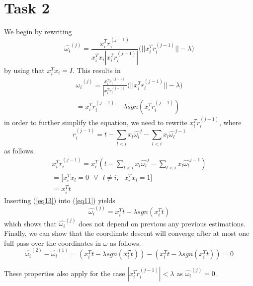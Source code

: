 \documentclass{article}
\begin{document}
\section{Task 2}
We begin by rewriting
\begin{equation}
    \hat{\omega_i}^{(j)} = \frac{x_i^T r_i^{(j-1)}}{x_i^T x_i |x_i^T r_i^{(j-1)}|} \bigg(||x_i^T r_i^{(j-1)}|| - \lambda \bigg)
\end{equation}
by using that $x_i^T x_i = I$. This results in
\begin{equation} \label{eq11}
\begin{split}
    \hat{\omega_i}^{(j)} = \frac{x_i^T r_i^{(j-1)}}{|x_i^T r_i^{(j-1)}|} \bigg(||x_i^T r_i^{(j-1)}|| - \lambda \bigg) \\
    = x_i^T r_i^{(j-1)} - \lambda sgn(x_i^T r_i^{(j-1)})
\end{split}
\end{equation}
in order to further simplify the equation, we need to rewrite $x_i^T r_i^{(j-1)}$, where
\begin{equation}
    r_i^{(j-1)} = t - \sum_{l<i} x_l \hat{\omega_l}^{j} - \sum_{l<i} x_l \hat{\omega_l}^{j-1}
\end{equation}
as follows.
\begin{equation} \label{eq13}
\begin{split}
    x_i^T r_i^{(j-1)} = x_i^T ( t - \sum_{l<i} x_l \hat{\omega_l}^{j} - \sum_{l<i} x_l \hat{\omega_l}^{j-1}) \\
    = \bigg[ x_i^T x_l = 0 \text{ }\forall \text{ } l \ne i, \text{ } x_i^T x_i = 1\bigg] \\
    = x_i^T t
\end{split}
\end{equation}
Inserting (\ref{eq13}) into (\ref{eq11}) yields
\begin{equation} \label{eq14}
     \hat{\omega_i}^{(j)} = x_i^T t - \lambda sgn(x_i^T t)
\end{equation}
which shows that $\hat{\omega_i}^{(j)}$ does not depend on previous any previous estimations. Finally, we can show that the coordinate descent will converge after at most one full pass over the coordinates in $\omega$ as follows.
\begin{equation}
    \hat{\omega_i}^{(2)} - \hat{\omega_i}^{(1)} = (x_i^T t - \lambda sgn(x_i^T t)) - (x_i^T t - \lambda sgn(x_i^T t)) = 0
\end{equation}

These properties also apply for the case $|x_i^T r_i^{(j-1)}| < \lambda$ as $\hat{\omega_i}^{(j)} = 0$.
\end{document}
